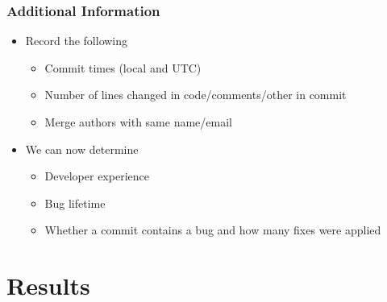 \documentclass[aspectratio=169]{beamer}
\begin{document}
\begin{frame}
  \frametitle{Additional Information}

  \begin{itemize}

    \item Record the following

    \begin{itemize}
      \item Commit times (local and UTC)

      \item Number of lines changed in code/comments/other in commit

      \item Merge authors with same name/email
    \end{itemize}

    \item We can now determine    
  
      \begin{itemize}
        \item Developer experience

        \item Bug lifetime

        \item Whether a commit contains a bug and how many fixes were applied
      \end{itemize}
  \end{itemize}
\end{frame}

\section{Results}
\end{document}
